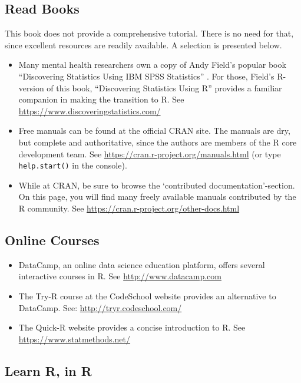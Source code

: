\documentclass[]{book}
\begin{document}
\subsection{Read Books}\label{read-books}

This book does not provide a comprehensive tutorial. There is no need
for that, since excellent resources are readily available. A selection
is presented below.

\begin{itemize}
\item
  Many mental health researchers own a copy of Andy Field's popular book
  ``Discovering Statistics Using IBM SPSS Statistics''
  \citep{FieldSPSS}. For those, Field's R-version of this book,
  ``Discovering Statistics Using R'' \citep{FieldR} provides a familiar
  companion in making the transition to R. See
  \url{https://www.discoveringstatistics.com/}
\item
  Free manuals can be found at the official CRAN site. The manuals are
  dry, but complete and authoritative, since the authors are members of
  the R core development team. See
  \url{https://cran.r-project.org/manuals.html} (or type
  \texttt{help.start()} in the console).
\item
  While at CRAN, be sure to browse the `contributed
  documentation'-section. On this page, you will find many freely
  available manuals contributed by the R community. See
  \url{https://cran.r-project.org/other-docs.html}
\end{itemize}

\subsection{Online Courses}\label{online-courses}

\begin{itemize}
\item
  DataCamp, an online data science education platform, offers several
  interactive courses in R. See \url{http://www.datacamp.com}
\item
  The Try-R course at the CodeSchool website provides an alternative to
  DataCamp. See: \url{http://tryr.codeschool.com/}
\item
  The Quick-R website provides a concise introduction to R. See
  \url{https://www.statmethods.net/}
\end{itemize}

\subsection{Learn R, in R}\label{learn-r-in-r}
\end{document}

